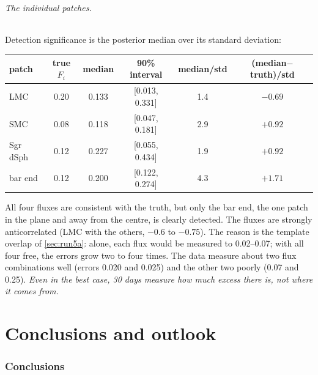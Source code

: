 \documentclass[11pt,a4paper]{article}
\begin{document}
\paragraph{The individual patches.} Detection significance is the posterior median
over its standard deviation:
\begin{center}
\small
\begin{tabular}{@{}lccccc@{}}
\toprule
patch & true $F_i$ & median & 90\% interval & median/std & (median$-$truth)/std \\
\midrule
LMC & 0.20 & 0.133 & [0.013, 0.331] & 1.4 & $-0.69$ \\
SMC & 0.08 & 0.118 & [0.047, 0.181] & 2.9 & $+0.92$ \\
Sgr dSph & 0.12 & 0.227 & [0.055, 0.434] & 1.9 & $+0.92$ \\
bar end & 0.12 & 0.200 & [0.122, 0.274] & 4.3 & $+1.71$ \\
\bottomrule
\end{tabular}
\end{center}
All four fluxes are consistent with the truth, but only the bar end, the one patch in
the plane and away from the centre, is clearly detected. The fluxes are strongly
anticorrelated (LMC with the others, $-0.6$ to $-0.75$). The reason is the template
overlap of \cref{sec:run5a}: alone, each flux would be measured to 0.02--0.07; with all
four free, the errors grow two to four times. The data measure about two flux
combinations well (errors 0.020 and 0.025) and the other two poorly (0.07 and 0.25).
\emph{Even in the best case, 30 days measure how much excess there is, not where it
comes from.}

\clearpage
\part{Conclusions and outlook}

\section{Conclusions}
\end{document}
